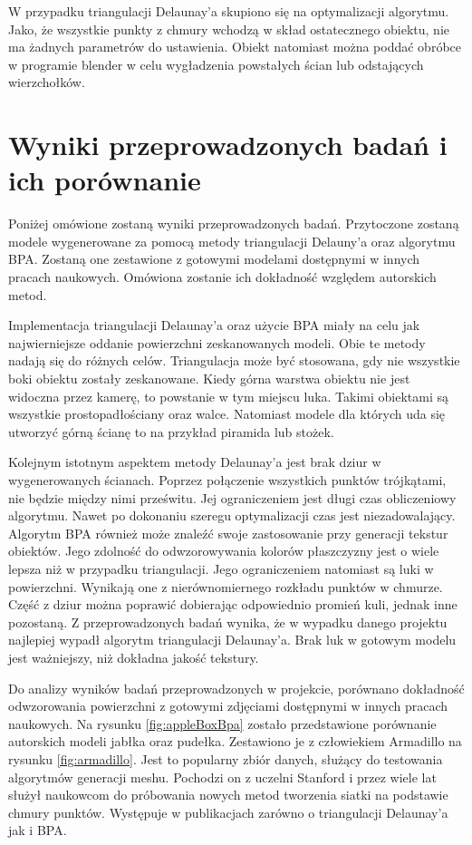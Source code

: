W przypadku triangulacji Delaunay'a skupiono się na optymalizacji algorytmu. Jako, że wszystkie punkty z chmury wchodzą w skład ostatecznego obiektu, nie ma żadnych parametrów do ustawienia. Obiekt natomiast można poddać obróbce w programie blender w celu wygładzenia powstałych ścian lub odstających wierzchołków. 

\section{Wyniki przeprowadzonych badań i ich porównanie}
Poniżej omówione zostaną wyniki przeprowadzonych badań. Przytoczone zostaną modele wygenerowane za pomocą metody triangulacji Delauny'a oraz algorytmu BPA. Zostaną one zestawione z gotowymi modelami dostępnymi w innych pracach naukowych. Omówiona zostanie ich dokładność względem autorskich metod.

Implementacja triangulacji Delaunay'a oraz użycie BPA miały na celu jak najwierniejsze oddanie powierzchni zeskanowanych modeli. Obie te metody nadają się do różnych celów. Triangulacja może być stosowana, gdy nie wszystkie boki obiektu zostały zeskanowane. Kiedy górna warstwa obiektu nie jest widoczna przez kamerę, to powstanie w tym miejscu luka. Takimi obiektami są wszystkie prostopadłościany oraz walce. Natomiast modele dla których uda się utworzyć górną ścianę to na przykład piramida lub stożek. 

Kolejnym istotnym aspektem metody Delaunay'a jest brak dziur w wygenerowanych ścianach. Poprzez połączenie wszystkich punktów trójkątami, nie będzie między nimi prześwitu. Jej ograniczeniem jest długi czas obliczeniowy algorytmu. Nawet po dokonaniu szeregu optymalizacji czas jest niezadowalający. Algorytm BPA również może znaleźć swoje zastosowanie przy generacji tekstur obiektów. Jego zdolność do odwzorowywania kolorów płaszczyzny jest o wiele lepsza niż w przypadku triangulacji. Jego ograniczeniem natomiast są luki w powierzchni. Wynikają one z nierównomiernego rozkładu punktów w chmurze. Część z dziur można poprawić dobierając odpowiednio promień kuli, jednak inne pozostaną. Z przeprowadzonych badań wynika, że w wypadku danego projektu najlepiej wypadł algorytm triangulacji Delaunay'a. Brak luk w gotowym modelu jest ważniejszy, niż dokładna jakość tekstury. 

Do analizy wyników badań przeprowadzonych w projekcie, porównano dokładność odwzorowania powierzchni z gotowymi zdjęciami dostępnymi w innych pracach naukowych. Na rysunku \ref{fig:appleBoxBpa} zostało przedstawione porównanie autorskich modeli jabłka oraz pudełka. Zestawiono je z człowiekiem Armadillo na rysunku \ref{fig:armadillo}. Jest to popularny zbiór danych, służący do testowania algorytmów generacji meshu. Pochodzi on z uczelni Stanford i przez wiele lat służył naukowcom do próbowania nowych metod tworzenia siatki na podstawie chmury punktów. Występuje w publikacjach zarówno o triangulacji Delaunay'a jak i BPA.  

